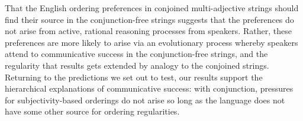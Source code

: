\documentclass[12pt,letterpaper]{article}
\begin{document}
That the English ordering preferences in conjoined multi-adjective strings should find their source in the conjunction-free strings suggests that the preferences do not arise from active, rational reasoning processes from speakers. Rather, these preferences are more likely to arise via an evolutionary process whereby speakers attend to communicative success in the conjunction-free strings, and the regularity that results gets extended by analogy to the conjoined strings. Returning to the predictions we set out to test, our results support the hierarchical explanations of communicative success: with conjunction, pressures for subjectivity-based orderings do not arise so long as the language does not have some other source for ordering regularities. \\[15pt]
 
\setlength{\bibsep}{0pt plus 0.3ex}
\setlength{\bibhang}{0.3in}			%
\titleformat{\section}{\normalfont\bfseries}{\thesection}{.5em}{}		%


\newcommand{\doi}[1]{\href{http://dx.doi.org/#1}{http://dx.doi.org/#1}}	%
\end{document}
